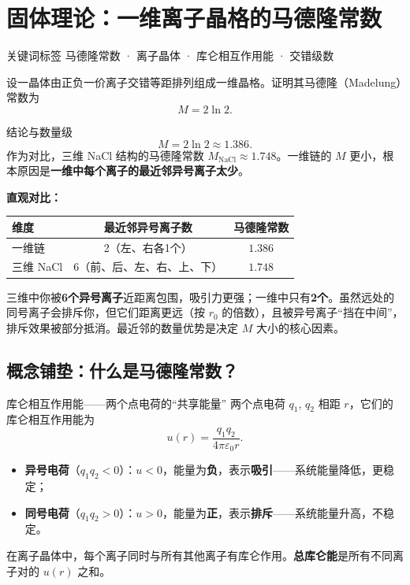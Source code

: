 \section{固体理论：一维离子晶格的马德隆常数}
\label{sec:madelung-1d}

\begin{tipbox}{关键词标签}
马德隆常数 · 离子晶体 · 库仑相互作用能 · 交错级数
\end{tipbox}

\begin{modelbox}
设一晶体由正负一价离子交错等距排列组成一维晶格。证明其马德隆（Madelung）常数为
\[
  M = 2\ln 2.
\]
\end{modelbox}

\vspace{0.3em}
\begin{insightbox}{结论与数量级}
\[
  \boxed{M = 2\ln 2 \approx 1.386}.
\]
作为对比，三维 NaCl 结构的马德隆常数 $M_{\text{NaCl}} \approx 1.748$。一维链的 $M$ 更小，根本原因是\textbf{一维中每个离子的最近邻异号离子太少}。

\textbf{直观对比：}
\begin{center}
\renewcommand{\arraystretch}{1.4}
\begin{tabular}{|l|c|c|}
\hline
\textbf{维度} & \textbf{最近邻异号离子数} & \textbf{马德隆常数} \\
\hline
一维链 & 2（左、右各1个） & $1.386$ \\
三维 NaCl & 6（前、后、左、右、上、下） & $1.748$ \\
\hline
\end{tabular}
\end{center}

三维中你被\textbf{6个异号离子}近距离包围，吸引力更强；一维中只有\textbf{2个}。虽然远处的同号离子会排斥你，但它们距离更远（按 $r_0$ 的倍数），且被异号离子``挡在中间''，排斥效果被部分抵消。最近邻的数量优势是决定 $M$ 大小的核心因素。
\end{insightbox}

\subsection{概念铺垫：什么是马德隆常数？}

\begin{modelbox}{库仑相互作用能——两个点电荷的``共享能量''}
两个点电荷 $q_1$, $q_2$ 相距 $r$，它们的库仑相互作用能为
\[
  u(r) = \frac{q_1 q_2}{4\pi\varepsilon_0 r}.
\]
\begin{itemize}[nosep]
  \item \textbf{异号电荷}（$q_1 q_2 < 0$）：$u < 0$，能量为\textbf{负}，表示\textbf{吸引}——系统能量降低，更稳定；
  \item \textbf{同号电荷}（$q_1 q_2 > 0$）：$u > 0$，能量为\textbf{正}，表示\textbf{排斥}——系统能量升高，不稳定。
\end{itemize}
在离子晶体中，每个离子同时与所有其他离子有库仑作用。\textbf{总库仑能}是所有不同离子对的 $u(r)$ 之和。
\end{modelbox}

